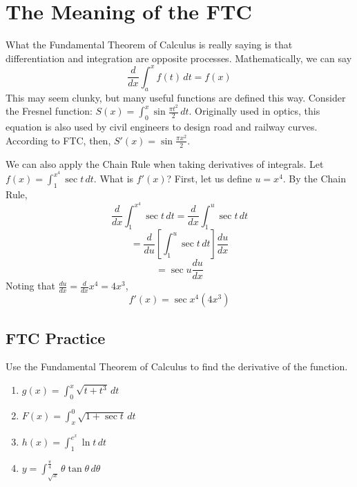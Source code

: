 \section{The Meaning of the FTC}
What the Fundamental Theorem of Calculus is really saying is that 
differentiation and integration are opposite processes. Mathematically, 
we can say $$\frac{d}{dx} \int_{a}^{x} f(t)\,dt = f(x)$$
This may seem clunky, but many useful functions are defined this way. 
Consider the Fresnel function: $S(x) = \int_{0}^{x}\sin{
\frac{\pi t^2}{2}}\,dt$. Originally used in optics, this equation is 
also used by civil engineers to design road and railway curves. 
According to FTC, then, $S'(x) = \sin{\frac{\pi x^2}{2}}$. 

We can also apply the Chain Rule when taking derivatives of integrals. 
Let $f(x) = \int_{1}^{x^4} \sec{t}\,dt$. What is $f'(x)$? First, let 
us define $u = x^4$. By the Chain Rule,
$$\frac{d}{dx}\int_{1}^{x^4} \sec{t}\,dt = \frac{d}{dx}\int_{1}^{u} 
\sec{t}\,dt$$ 
$$= \frac{d}{du}\left[\int_{1}^{u} \sec{t}\,dt\right]\frac{du}{dx}$$
$$ = \sec{u} \frac{du}{dx}$$
Noting that $\frac{du}{dx} = \frac{d}{dx}x^4 = 4x^3$, 
$$f'(x) = \sec{x^4}(4x^3)$$

\subsection{FTC Practice}
\begin{Exercise}[label=FTC1]
Use the Fundamental Theorem of Calculus to find the derivative of the 
function. 
	\begin{enumerate}
	\item $g(x) = \int_0^x \sqrt{t + t^3}\,dt$
	\item $F(x) = \int_x^0 \sqrt{1 + \sec{t}}\,dt$
	\item $h(x) = \int_1^{e^x} \ln{t}\,dt$
	\item $y = \int_{\sqrt{x}}^{\frac{\pi}{4}} \theta \tan{\theta}\,
	d\theta$
	\end{enumerate}
\end{Exercise}

